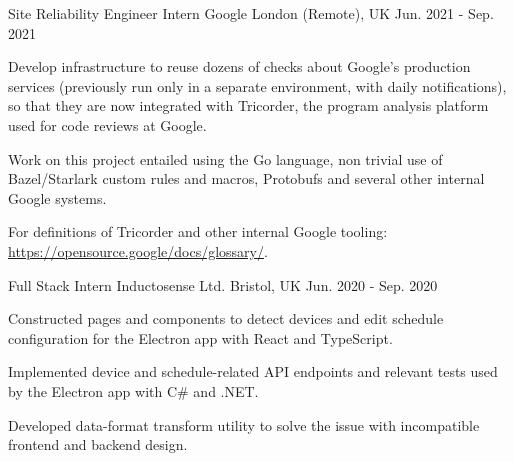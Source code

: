 

\begin{cventries}

  \cventry
    {Site Reliability Engineer Intern} %
    {Google} %
    {London (Remote), UK} %
    {Jun. 2021 - Sep. 2021} %
    {
      \begin{cvitems} %
        \item {Develop infrastructure to reuse dozens of checks about Google's production services (previously run only in a separate environment, with daily notifications), so that they are now integrated with Tricorder, the program analysis platform used for code reviews at Google.}
        \item {Work on this project entailed using the Go language, non trivial use of Bazel/Starlark custom rules and macros, Protobufs and several other internal Google systems.}
        \item {For definitions of Tricorder and other internal Google tooling: \href{https://opensource.google/docs/glossary/}{https://opensource.google/docs/glossary/}.}
      \end{cvitems}
    }

  \cventry
    {Full Stack Intern} %
    {Inductosense Ltd.} %
    {Bristol, UK} %
    {Jun. 2020 - Sep. 2020} %
    {
      \begin{cvitems} %
        \item {Constructed pages and components to detect devices and edit schedule configuration for the Electron app with React and TypeScript.}
        \item {Implemented device and schedule-related API endpoints and relevant tests used by the Electron app with C\# and .NET.}
        \item {Developed data-format transform utility to solve the issue with incompatible frontend and backend design.}
      \end{cvitems}
    }


\end{cventries}
